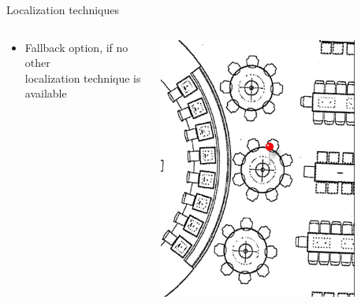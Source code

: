 \documentclass[11pt]{beamer}
\begin{document}
\begin{frame}{Localization techniques}
\begin{columns}
\begin{column}{0.65\textwidth}
      \begin{itemize}
        \item Fallback option, if no other\\localization technique is available
      \end{itemize}

    \end{column}

    \hfill
    \begin{column}{0.3\textwidth}
      \includegraphics[width=0.8\textwidth]{manualpinpoint}%
    \end{column}

  \end{columns}

\end{frame}
\end{document}
